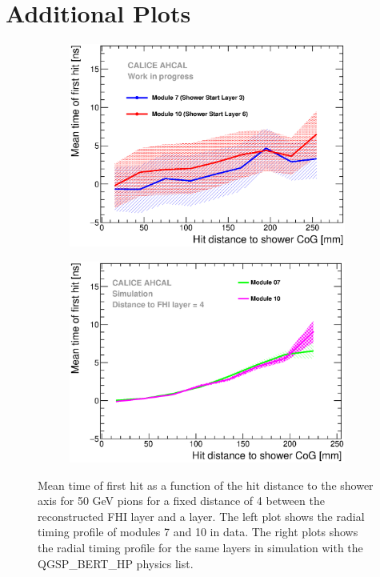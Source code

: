 \documentclass[a4paper]{article}
\begin{document}
\section{Additional Plots}

\begin{figure}[htbp!]
  \begin{subfigure}[t]{0.49\textwidth}
    \centering
    \includegraphics[width=1\textwidth]{../Draft/fig/Timing_Radius_Comparison_ShortAsymRange_ShowerStart.eps}
    \caption{}\label{fig:Radius_FHI}
  \end{subfigure}
  \hfill
  \begin{subfigure}[t]{0.49\textwidth}
    \centering
    \includegraphics[width=1\textwidth]{../Draft/fig/Radius_ShowerStartTruth.eps}
    \caption{}\label{fig:Radius_FHISim1}
  \end{subfigure}
  \caption{Mean time of first hit as a function of the hit distance to the shower axis for 50 GeV pions for a fixed distance of 4 between the reconstructed FHI layer and a layer. The left plot shows the radial timing profile of modules 7 and 10 in data. The right plots shows the radial timing profile for the same layers in simulation with the QGSP\_BERT\_HP physics list.}
  \label{fig:Radius_FHIAll}
\end{figure}
\end{document}

